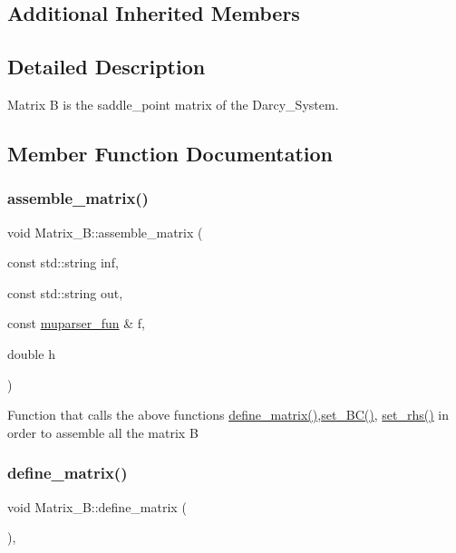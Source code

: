 \subsection*{Additional Inherited Members}


\subsection{Detailed Description}
Matrix B is the saddle\+\_\+point matrix of the Darcy\+\_\+\+System. 

\subsection{Member Function Documentation}
\mbox{\label{classMatrix__B_a4f6fc5aef429ca2b80901e280ab5a593}} 
\subsubsection{\texorpdfstring{assemble\+\_\+matrix()}{assemble\_matrix()}}
{\footnotesize\ttfamily void Matrix\+\_\+\+B\+::assemble\+\_\+matrix (\begin{DoxyParamCaption}\item[{const std\+::string}]{inf,  }\item[{const std\+::string}]{out,  }\item[{const \hyperlink{classmuparser__fun}{muparser\+\_\+fun} \&}]{f,  }\item[{double}]{h }\end{DoxyParamCaption})}

Function that calls the above functions \hyperlink{classMatrix__B_a996a421d226769d39583f228d0ce0f00}{define\+\_\+matrix()},\hyperlink{classMatrix__B_a1a076a3ccac19b0ad436686bc8b8babd}{set\+\_\+\+B\+C()}, \hyperlink{classMatrix__B_ab4f89f8522128bd9677fd301f4f96c6e}{set\+\_\+rhs()} in order to assemble all the matrix B \mbox{\label{classMatrix__B_a996a421d226769d39583f228d0ce0f00}} 
\subsubsection{\texorpdfstring{define\+\_\+matrix()}{define\_matrix()}}
{\footnotesize\ttfamily void Matrix\+\_\+\+B\+::define\+\_\+matrix (\begin{DoxyParamCaption}{ }\end{DoxyParamCaption})\hspace{0.3cm}{\ttfamily [override]}, {\ttfamily [virtual]}}

